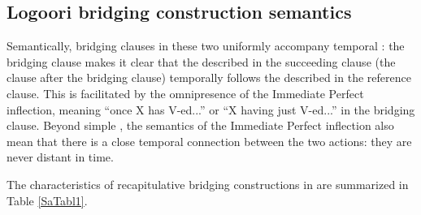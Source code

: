 \documentclass[output=paper]{LSP/langsci}
\begin{document}
\subsection{Logoori bridging construction semantics}
\label{Sasemantics}
Semantically,  bridging clauses in these two  uniformly accompany temporal : the bridging clause makes it clear that the  described in the succeeding clause (the clause after the bridging clause) temporally follows the  described in the reference clause. This is facilitated by the omnipresence of the Immediate Perfect inflection, meaning ``once X has V-ed...'' or ``X having just V-ed...'' in the bridging clause. Beyond simple , the semantics of the Immediate Perfect inflection also mean that there is a close temporal connection between the two actions: they are never distant in time.

The characteristics of  recapitulative bridging constructions in  are summarized in Table \ref{SaTabl1}.



\end{document}
